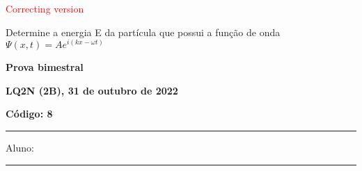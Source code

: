 \documentclass[12pt, addpoints]{exam}
\begin{document}
        \begin{center}
\textcolor{red}{\emph\Large Correcting version}\end{center}
\begin{questions}
\begin{multicols*}{2}
\question[20] Determine a energia E da partícula que possui a função de onda $\Psi(x,t)=Ae^{i(kx-\omega t)}$

\begin{oneparchoices}
\end{oneparchoices}
\end{multicols*}
\end{questions}
\newpage
        \begin{minipage}[b]{0.75\linewidth}
            \begin{flushleft}
                {\bf \large Prova bimestral}
            \end{flushleft}
            \begin{flushleft}
                {\bf \large LQ2N (2B), 31 de outubro de 2022}
            \end{flushleft}
        \end{minipage}
        \begin{minipage}[b]{0.20\linewidth}
            \begin{flushright}
                {\bf \large Código: 8}
            \end{flushright}
        \end{minipage}
        \vspace{0.5cm} \hrule \vspace{0.5cm}
        \begin{minipage}{0.75\linewidth}
            Aluno:
        \end{minipage}
        \vspace{0.5cm} \hrule \vspace{0.5cm}
\end{document}
